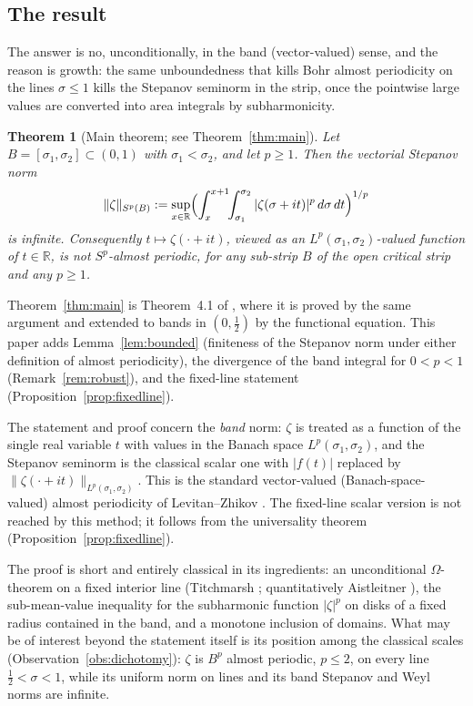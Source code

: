 \documentclass[11pt]{amsart}
\newtheorem*{theorem*}{Theorem}
\theoremstyle{definition}
\theoremstyle{remark}
\newcommand{\bbR}{\mathbb{R}}
\begin{document}
\subsection{The result}
The answer is no, unconditionally, in the band (vector-valued) sense,
and the reason is growth: the same unboundedness that kills Bohr
almost periodicity on the lines $\sigma\leq1$ kills the Stepanov
seminorm in the strip, once the pointwise large values are converted
into area integrals by subharmonicity.

\begin{theorem*}[Main theorem; see Theorem~\ref{thm:main}]
Let $B=[\sigma_1,\sigma_2]\subset(0,1)$ with
$\sigma_1<\sigma_2$, and let $p\geq1$. Then the vectorial Stepanov norm
\[
\|\zeta\|_{S^p(B)}
:=\sup_{x\in\bbR}\Bigl(\int_x^{x+1}\!\!\int_{\sigma_1}^{\sigma_2}
|\zeta(\sigma+it)|^p\,d\sigma\,dt\Bigr)^{1/p}
\]
is infinite. Consequently $t\mapsto\zeta(\cdot+it)$, viewed as an
$L^p(\sigma_1,\sigma_2)$-valued function of $t\in\bbR$, is not
$S^p$-almost periodic, for any sub-strip $B$ of the open critical
strip and any $p\geq1$.
\end{theorem*}

Theorem~\ref{thm:main} is Theorem~4.1 of \cite{P30}, where it is proved
by the same argument and extended to bands in $(0,\tfrac12)$ by the
functional equation. This paper adds Lemma~\ref{lem:bounded}
(finiteness of the Stepanov norm under either definition of almost
periodicity), the divergence of the band integral for $0<p<1$
(Remark~\ref{rem:robust}), and the fixed-line statement
(Proposition~\ref{prop:fixedline}).

The statement and proof concern the \emph{band} norm: $\zeta$ is
treated as a function of the single real variable $t$ with values in
the Banach space $L^p(\sigma_1,\sigma_2)$, and the Stepanov seminorm
is the classical scalar one with $|f(t)|$ replaced by
$\|\zeta(\cdot+it)\|_{L^p(\sigma_1,\sigma_2)}$. This is the standard
vector-valued (Banach-space-valued) almost periodicity of
Levitan--Zhikov \cite{LevitanZhikov}. The fixed-line scalar version is not reached by this method; it
follows from the universality theorem
(Proposition~\ref{prop:fixedline}).

The proof is short and entirely classical in its ingredients: an
unconditional $\Omega$-theorem on a fixed interior line
(Titchmarsh \cite[Thm.~8.12]{Titchmarsh}; quantitatively Aistleitner
\cite{Aistleitner}), the sub-mean-value inequality for the subharmonic
function $|\zeta|^p$ on disks of a fixed radius contained in the band,
and a monotone inclusion of domains. What may be of interest beyond
the statement itself is its position among the classical scales
(Observation~\ref{obs:dichotomy}): $\zeta$ is $B^p$ almost periodic,
$p\le2$, on every line $\tfrac12<\sigma<1$, while its uniform norm on lines
and its band Stepanov and Weyl norms are infinite.
\end{document}
